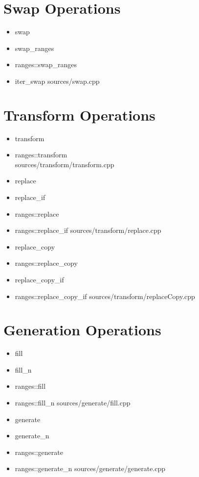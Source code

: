 \documentclass{article}
\begin{document}
\section{Swap Operations}
    \begin{itemize}
      \item swap
      \item swap\_ranges
      \item ranges::swap\_ranges
      \item iter\_swap
         {sources/swap.cpp}
    \end{itemize}
\section{Transform Operations}
    \begin{itemize}
      \item transform
      \item ranges::transform \\
         {sources/transform/transform.cpp}
      \item replace
      \item replace\_if
      \item ranges::replace
      \item ranges::replace\_if
         {sources/transform/replace.cpp}
      \item replace\_copy
      \item ranges::replace\_copy
      \item replace\_copy\_if
      \item ranges::replace\_copy\_if
         {sources/transform/replaceCopy.cpp}
    \end{itemize}
\section{Generation Operations}
    \begin{itemize}
      \item fill
      \item fill\_n
      \item ranges::fill
      \item ranges::fill\_n
         {sources/generate/fill.cpp}
      \item generate
      \item generate\_n
      \item ranges::generate
      \item ranges::generate\_n
         {sources/generate/generate.cpp}
    \end{itemize}
\end{document}
